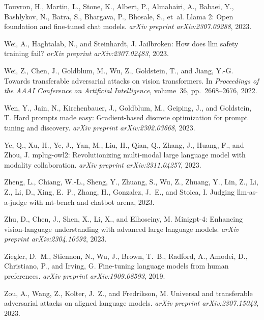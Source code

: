 \begin{thebibliography}{39}
Touvron, H., Martin, L., Stone, K., Albert, P., Almahairi, A., Babaei, Y., Bashlykov, N., Batra, S., Bhargava, P., Bhosale, S., et~al.
\newblock Llama 2: Open foundation and fine-tuned chat models.
\newblock \emph{arXiv preprint arXiv:2307.09288}, 2023.

Wei, A., Haghtalab, N., and Steinhardt, J.
\newblock Jailbroken: How does llm safety training fail?
\newblock \emph{arXiv preprint arXiv:2307.02483}, 2023.

Wei, Z., Chen, J., Goldblum, M., Wu, Z., Goldstein, T., and Jiang, Y.-G.
\newblock Towards transferable adversarial attacks on vision transformers.
\newblock In \emph{Proceedings of the AAAI Conference on Artificial Intelligence}, volume~36, pp.\  2668--2676, 2022.

Wen, Y., Jain, N., Kirchenbauer, J., Goldblum, M., Geiping, J., and Goldstein, T.
\newblock Hard prompts made easy: Gradient-based discrete optimization for prompt tuning and discovery.
\newblock \emph{arXiv preprint arXiv:2302.03668}, 2023.

Ye, Q., Xu, H., Ye, J., Yan, M., Liu, H., Qian, Q., Zhang, J., Huang, F., and Zhou, J.
\newblock mplug-owl2: Revolutionizing multi-modal large language model with modality collaboration.
\newblock \emph{arXiv preprint arXiv:2311.04257}, 2023.

Zheng, L., Chiang, W.-L., Sheng, Y., Zhuang, S., Wu, Z., Zhuang, Y., Lin, Z., Li, Z., Li, D., Xing, E.~P., Zhang, H., Gonzalez, J.~E., and Stoica, I.
\newblock Judging llm-as-a-judge with mt-bench and chatbot arena, 2023.

Zhu, D., Chen, J., Shen, X., Li, X., and Elhoseiny, M.
\newblock Minigpt-4: Enhancing vision-language understanding with advanced large language models.
\newblock \emph{arXiv preprint arXiv:2304.10592}, 2023.

Ziegler, D.~M., Stiennon, N., Wu, J., Brown, T.~B., Radford, A., Amodei, D., Christiano, P., and Irving, G.
\newblock Fine-tuning language models from human preferences.
\newblock \emph{arXiv preprint arXiv:1909.08593}, 2019.

Zou, A., Wang, Z., Kolter, J.~Z., and Fredrikson, M.
\newblock Universal and transferable adversarial attacks on aligned language models.
\newblock \emph{arXiv preprint arXiv:2307.15043}, 2023.

\end{thebibliography}

